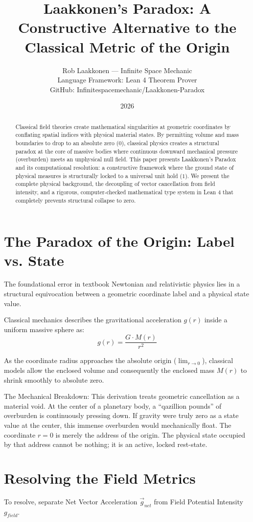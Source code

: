 \documentclass[12pt,a4paper]{article}
\title{Laakkonen's Paradox: A Constructive Alternative to the Classical Metric of the Origin}
\author{Rob Laakkonen --- Infinite Space Mechanic \\ Language Framework: Lean 4 Theorem Prover \\ GitHub: Infinitespacemechanic/Laakkonen-Paradox}
\date{2026}
\begin{document}
\maketitle

\begin{abstract}
Classical field theories create mathematical singularities at geometric coordinates by conflating spatial indices with physical material states. By permitting volume and mass boundaries to drop to an absolute zero ($0$), classical physics creates a structural paradox at the core of massive bodies where continuous downward mechanical pressure (overburden) meets an unphysical null field. This paper presents Laakkonen's Paradox and its computational resolution: a constructive framework where the ground state of physical measures is structurally locked to a universal unit hold ($1$). We present the complete physical background, the decoupling of vector cancellation from field intensity, and a rigorous, computer-checked mathematical type system in Lean 4 that completely prevents structural collapse to zero.
\end{abstract}

\section{The Paradox of the Origin: Label vs. State}
The foundational error in textbook Newtonian and relativistic physics lies in a structural equivocation between a geometric coordinate label and a physical state value.

Classical mechanics describes the gravitational acceleration $g(r)$ inside a uniform massive sphere as:
$$ g(r) = \frac{G \cdot M(r)}{r^2} $$

As the coordinate radius approaches the absolute origin ($\lim_{r\to 0}$), classical models allow the enclosed volume and consequently the enclosed mass $M(r)$ to shrink smoothly to absolute zero.

The Mechanical Breakdown: This derivation treats geometric cancellation as a material void. At the center of a planetary body, a ``qazillion pounds'' of overburden is continuously pressing down. If gravity were truly zero as a state value at the center, this immense overburden would mechanically float. The coordinate $r=0$ is merely the address of the origin. The physical state occupied by that address cannot be nothing; it is an active, locked rest-state.

\section{Resolving the Field Metrics}
To resolve, separate Net Vector Acceleration $\vec{g}_{net}$ from Field Potential Intensity $g_{field}$.
\end{document}
